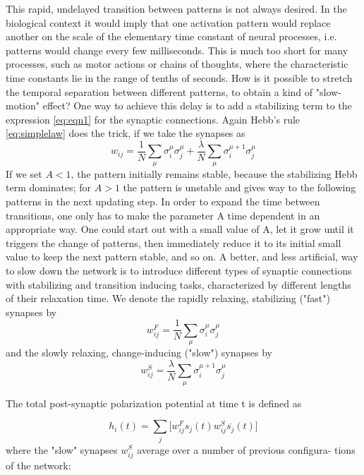 This rapid, undelayed transition between patterns is not always desired. In the biological context it would imply that one activation pattern would replace another on the scale of the elementary time constant of neural processes, i.e. patterns would change every few milliseconds. This is much too short for many processes, such as motor actions or chains of thoughts, where the characteristic time constants lie in the range of tenths of seconds. How is it possible to stretch the temporal separation between different patterns, to obtain a kind of "slow-motion" effect? One way to achieve this delay is to add a stabilizing term to the expression \ref{eq:eqn1} for the synaptic connections. Again Hebb's rule \ref{eq:simplelaw} does the trick, if we take the synapses as
\begin{equation}
    w_{ij}=\frac{1}{N}\sum_{\mu}\sigma^{\mu}_{i}\sigma^{\mu}_{j}+\frac{\lambda}{N}\sum_{\mu}\sigma^{\mu+1}_{i}\sigma^{\mu}_{j}
\end{equation}
If we set $A < 1$, the pattern initially remains stable, because the stabilizing Hebb term dominates; for $A > 1$ the pattern is unstable and gives way to the following patterns in the next updating step. In order to expand the time between transitions, one only has to make the parameter A time dependent
in an appropriate way. One could start out with a small value of A, let it grow until it triggers the change of patterns, then immediately reduce it to its initial small value to keep the next pattern stable, and so on.
A better, and less artificial, way to slow down the network is to introduce different types of synaptic connections with stabilizing and transition inducing tasks, characterized by different lengths of their relaxation time. We denote the rapidly relaxing, stabilizing ("fast") synapses by
\begin{equation}
     w_{ij}^{F}=\frac{1}{N}\sum_{\mu}\sigma^{\mu}_{i}\sigma^{\mu}_{j}
\end{equation}
and the slowly relaxing, change-inducing ("slow") synapses by
\begin{equation}
 w_{ij}^{S}=\frac{\lambda}{N}\sum_{\mu}\sigma^{\mu+1}_{i}\sigma^{\mu}_{j}
\end{equation}

The total post-synaptic polarization potential at time t is defined as

\begin{equation}
    h_{i}(t)=\sum_{j} \Big[ w_{ij}^{F}s_{j}(t)w_{ij}^{S}\overline{s_{j}}(t)\Big]
\end{equation}
where the "slow" synapses $w_{ij}^{S}$ average over a number of previous configura-
tions of the network:


